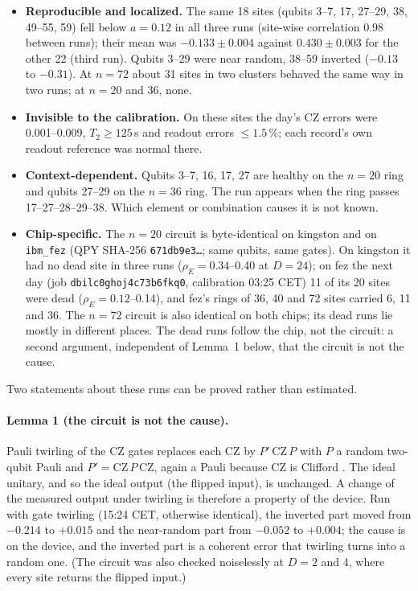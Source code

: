 \documentclass[11pt]{article}
\begin{document}
\begin{itemize}
\item \textbf{Reproducible and localized.} The same 18 sites (qubits 3--7, 17, 27--29, 38, 49--55, 59) fell below
  $a=0.12$ in all three runs (site-wise correlation 0.98 between runs); their mean was $-0.133\pm0.004$ against
  $0.430\pm0.003$ for the other 22 (third run). Qubits 3--29 were near random, 38--59 inverted ($-0.13$ to $-0.31$).
  At $n=72$ about 31 sites in two clusters behaved the same way in two runs; at $n=20$ and 36, none.
\item \textbf{Invisible to the calibration.} On these sites the day's CZ errors were 0.001--0.009, $T_2\ge125$\,\textmu s
  and readout errors $\le1.5$\,\%; each record's own readout reference was normal there.
\item \textbf{Context-dependent.} Qubits 3--7, 16, 17, 27 are healthy on the $n=20$ ring and qubits 27--29 on the
  $n=36$ ring. The run appears when the ring passes 17--27--28--29--38. Which element or combination causes it is not
  known.
\item \textbf{Chip-specific.} The $n=20$ circuit is byte-identical on kingston and on \texttt{ibm\_fez} (QPY SHA-256
  \texttt{671db9e3\ldots}; same qubits, same gates). On kingston it had no dead site in three runs ($\rho_E=0.34$--0.40
  at $D=24$); on fez the next day (job \texttt{dbilc0ghoj4c73b6fkq0}, calibration 03:25 CET) 11 of its 20 sites were
  dead ($\rho_E=0.12$--0.14), and fez's rings of 36, 40 and 72 sites carried 6, 11 and 36. The $n=72$ circuit is also
  identical on both chips; its dead runs lie mostly in different places. The dead runs follow the chip, not the
  circuit: a second argument, independent of Lemma~1 below, that the circuit is not the cause.
\end{itemize}

Two statements about these runs can be proved rather than estimated.

\paragraph{Lemma 1 (the circuit is not the cause).} Pauli twirling of the CZ gates replaces each CZ by $P'\,\mathrm{CZ}\,P$
with $P$ a random two-qubit Pauli and $P'=\mathrm{CZ}\,P\,\mathrm{CZ}$, again a Pauli because CZ is Clifford
\cite{wallman2016}. The ideal unitary, and so the ideal output (the flipped input), is unchanged. A change of the
measured output under twirling is therefore a property of the device. Run with gate twirling (15:24 CET, otherwise
identical), the inverted part moved from $-0.214$ to $+0.015$ and the near-random part from $-0.052$ to $+0.004$; the
cause is on the device, and the inverted part is a coherent error that twirling turns into a random one. (The circuit
was also checked noiselessly at $D=2$ and 4, where every site returns the flipped input.)
\end{document}

